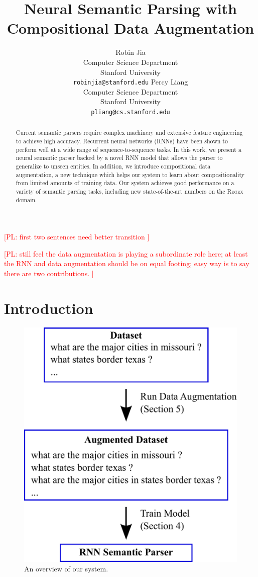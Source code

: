 \documentclass[11pt,letterpaper]{article}
\title{Neural Semantic Parsing with Compositional Data Augmentation}
\author{Robin Jia\\
	    Computer Science Department\\
      Stanford University\\
	    {\tt robinjia@stanford.edu}
	  \And
    Percy Liang\\
    Computer Science Department\\
  	Stanford University\\
  {\tt pliang@cs.stanford.edu}}
\date{}
\newcommand{\regex}{\textsc{Regex}\xspace}
\newcommand\pl[1]{\textcolor{red}{[PL: #1]}}
\begin{document}
\maketitle

\begin{abstract}
Current semantic parsers require complex machinery and
extensive feature engineering to achieve high accuracy.
Recurrent neural networks (RNNs)
have been shown to perform well at a wide range of sequence-to-sequence tasks.
In this work, we present a neural semantic parser
backed by a novel RNN model that allows the parser
to generalize to unseen entities.
In addition, we introduce
compositional data augmentation,
a new technique
which helps our system to learn
about compositionality from limited amounts of training data.
Our system achieves good performance on a variety of semantic parsing tasks,
including new state-of-the-art numbers on the \regex domain.
\end{abstract}

\pl{
first two sentences need better transition
}

\pl{still feel the data augmentation is playing a subordinate role here;
at least the RNN and data augmentation should be on equal footing;
easy way is to say there are two contributions.
}

\section{Introduction}
\begin{figure}[t] 
\small
\begin{center} 
  \includegraphics[scale=0.4]{fig-overview.pdf}
\end{center} 
\caption{An overview of our system.}
\label{fig:overview}
\end{figure}
\end{document}
